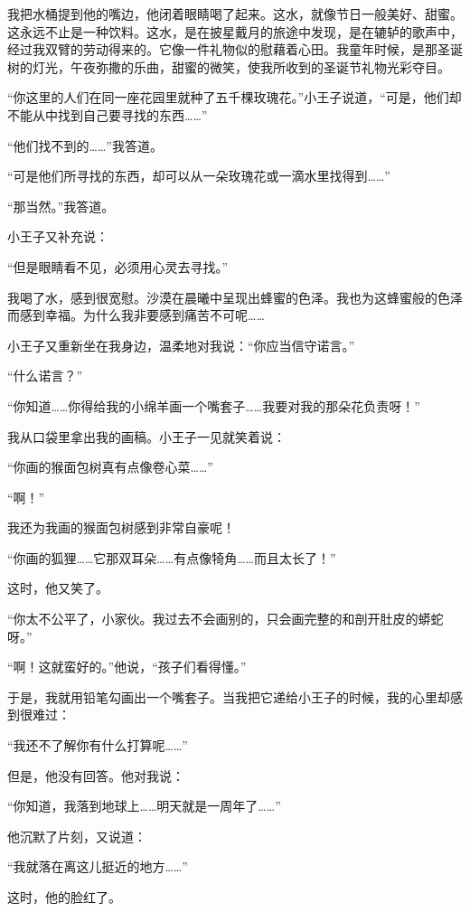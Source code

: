 我把水桶提到他的嘴边，他闭着眼睛喝了起来。这水，就像节日一般美好、甜蜜。这永远不止是一种饮料。这水，是在披星戴月的旅途中发现，是在辘轳的歌声中，经过我双臂的劳动得来的。它像一件礼物似的慰藉着心田。我童年时候，是那圣诞树的灯光，午夜弥撒的乐曲，甜蜜的微笑，使我所收到的圣诞节礼物光彩夺目。

“你这里的人们在同一座花园里就种了五千棵玫瑰花。”小王子说道，“可是，他们却不能从中找到自己要寻找的东西\ldots{}\ldots{}”

“他们找不到的\ldots{}\ldots{}”我答道。

“可是他们所寻找的东西，却可以从一朵玫瑰花或一滴水里找得到\ldots{}\ldots{}”

“那当然。”我答道。

小王子又补充说：

“但是眼睛看不见，必须用心灵去寻找。”

我喝了水，感到很宽慰。沙漠在晨曦中呈现出蜂蜜的色泽。我也为这蜂蜜般的色泽而感到幸福。为什么我非要感到痛苦不可呢\ldots{}\ldots{}

小王子又重新坐在我身边，温柔地对我说：“你应当信守诺言。”

“什么诺言？”

“你知道\ldots{}\ldots{}你得给我的小绵羊画一个嘴套子\ldots{}\ldots{}我要对我的那朵花负责呀！”

我从口袋里拿出我的画稿。小王子一见就笑着说：

“你画的猴面包树真有点像卷心菜\ldots{}\ldots{}”

“啊！”

我还为我画的猴面包树感到非常自豪呢！

“你画的狐狸\ldots{}\ldots{}它那双耳朵\ldots{}\ldots{}有点像犄角\ldots{}\ldots{}而且太长了！”

这时，他又笑了。

“你太不公平了，小家伙。我过去不会画别的，只会画完整的和剖开肚皮的蟒蛇呀。”

“啊！这就蛮好的。”他说，“孩子们看得懂。”

于是，我就用铅笔勾画出一个嘴套子。当我把它递给小王子的时候，我的心里却感到很难过：

“我还不了解你有什么打算呢\ldots{}\ldots{}”

但是，他没有回答。他对我说：

“你知道，我落到地球上\ldots{}\ldots{}明天就是一周年了\ldots{}\ldots{}”

他沉默了片刻，又说道：

“我就落在离这儿挺近的地方\ldots{}\ldots{}”

这时，他的脸红了。

